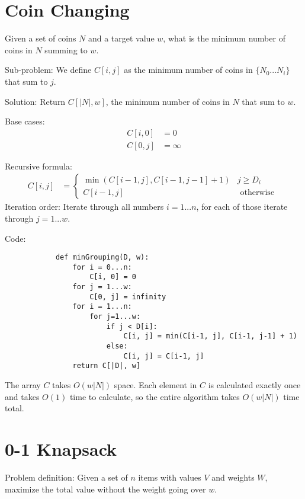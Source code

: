     \section{Coin Changing}
        Given a set of coins $N$ and a target value $w$, what is the minimum
        number of coins in $N$ summing to $w$.

        Sub-problem: We define $C[i, j]$ as the minimum number of coins in
        $\{N_0...N_i\}$ that sum to $j$.

        Solution: Return $C[|N|, w]$, the minimum number of coins in $N$ that
        sum to $w$.

        Base cases:
        \begin{align*}
            C[i, 0] &= 0 \\
            C[0, j] &= \infty
        \end{align*}

        Recursive formula:
        \begin{align*}
            C[i, j] &=
            \left\{
                \begin{array}{lr}
                    \min(C[i-1, j], C[i-1, j-1] + 1) & j \ge D_i \\
                    C[i-1, j] & \text{ otherwise }
                \end{array}
            \right.
        \end{align*}
        Iteration order: Iterate through all numbers $i = 1...n$, for each of
        those iterate through $j = 1...w$.

        Code:
        \begin{verbatim}
            def minGrouping(D, w):
                for i = 0...n:
                    C[i, 0] = 0
                for j = 1...w:
                    C[0, j] = infinity
                for i = 1...n:
                    for j=1...w:
                        if j < D[i]:
                            C[i, j] = min(C[i-1, j], C[i-1, j-1] + 1)
                        else:
                            C[i, j] = C[i-1, j]
                return C[|D|, w]
        \end{verbatim}
        The array $C$ takes $O(w|N|)$ space. Each element in $C$ is calculated
        exactly once and takes $O(1)$ time to calculate, so the entire algorithm
        takes $O(w|N|)$ time total.

    \section{0-1 Knapsack}
        Problem definition: Given a set of $n$ items with values $V$ and weights
        $W$, maximize the total value without the weight going over $w$.

